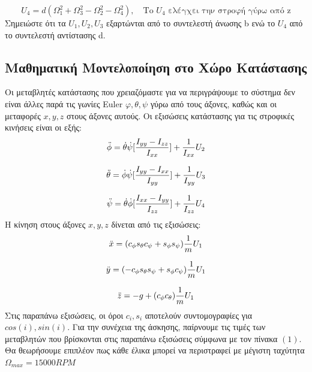 \documentclass[a4paper,12pt]{article}
\begin{document}
\begin{equation}
    U_4 = d(\Omega_1^2+\Omega_3^2-\Omega_2^2-\Omega_4^2),  \quad \textrm{Το $U_4$ ελέγχει την στροφή γύρω από z}
\end{equation}
\newline
Σημειώστε ότι τα $U_1,U_2,U_3$ εξαρτώνται από το συντελεστή άνωσης b ενώ το $U_4$ από το 
συντελεστή αντίστασης d.
\newpage
\subsection{Μαθηματική Μοντελοποίηση στο Χώρο Κατάστασης}
Οι μεταβλητές κατάστασης που χρειαζόμαστε για να περιγράψουμε το σύστημα δεν είναι άλλες παρά τις γωνίες Euler $φ, \theta, \psi$ γύρω από τους άξονες, καθώς και οι μεταφορές $x, y, z$ στους άξονες αυτούς. Οι εξισώσεις κατάστασης για τις στροφικές κινήσεις είναι οι εξής:
\begin{equation}
    \Ddot{\phi} = \dot{\theta}\dot{\psi}[\frac{I_{yy}-I_{zz}}{I_{xx}}] + \frac{1}{I_{xx}}U_2
\end{equation}

\begin{equation}
    \Ddot{\theta} = \dot{\phi}\dot{\psi}[\frac{I_{yy}-I_{xx}}{I_{yy}}] + \frac{1}{I_{yy}}U_3
\end{equation}

\begin{equation}
    \Ddot{\psi} = \dot{\theta}\dot{\phi}[\frac{I_{xx}-I_{yy}}{I_{zz}}] + \frac{1}{I_{zz}}U_4
\end{equation}
\newline
Η κίνηση στους άξονες $x, y, z$ δίνεται από τις εξισώσεις:
\begin{equation}
    \Ddot{x} = (c_{\phi}s_{\theta}c_{\psi} + s_{\phi}s_{\psi})\frac{1}{m}U_1
\end{equation}

\begin{equation}
    \Ddot{y} = (-c_{\phi}s_{\theta}s_{\psi} + s_{\phi}c_{\psi})\frac{1}{m}U_1
\end{equation}

\begin{equation}
    \Ddot{z} = -g +(c_{\phi}c_{\theta})\frac{1}{m}U_1
\end{equation}
\newline
\noindent
Στις παραπάνω εξισώσεις, οι όροι $c_{i}, s_{i}$ αποτελούν συντομογραφίες για $cos(i), sin(i)$. Για την συνέχεια της άσκησης, παίρνουμε τις τιμές των μεταβλητών που βρίσκονται στις παραπάνω εξισώσεις σύμφωνα με τον πίνακα $(1)$. Θα θεωρήσουμε επιπλέον πως κάθε έλικα μπορεί να περιστραφεί με μέγιστη ταχύτητα $\Omega_{max} = 15000 RPM$
\end{document}
